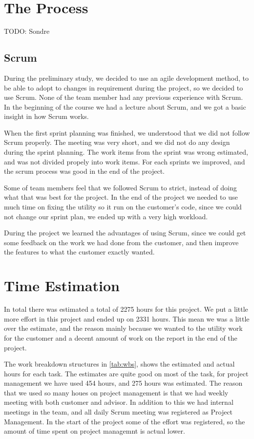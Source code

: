 \section{The Process}
TODO: Sondre

\subsection{Scrum}
During the preliminary study, we decided to use an agile development method, 
to be able to adopt to changes in requirement during the project, so we 
decided to use Scrum. None of the team member had any previous experience with 
Scrum. In the beginning of the course we had a lecture about Scrum, and we 
got a basic insight in how Scrum works.

When the first sprint planning was finished, we understood that we did not 
follow Scrum properly. The meeting was very short, and we did not do any 
design during the sprint planning. The work items from the sprint was wrong 
estimated, and was not divided propely into work items. For each sprints we 
improved, and the scrum process was good in the end of the project.

Some of team members feel that we followed Scrum to strict, instead of doing 
what that was best for the project. In the end of the project we needed to use 
much time on fixing the utility so it run on the customer's code, since we 
could not change our sprint plan, we ended up with a very high workload.

During the project we learned the advantages of using Scrum, since we could 
get some feedback on the work we had done from the customer, and then improve 
the features to what the customer exactly wanted. 

\section{Time Estimation}
In total there was estimated a total of 2275 hours for this project. We put a 
little more effort in this project and ended up on 2331 hours. This mean we 
was a little over the estimate, and the reason mainly because we wanted to the 
utility work for the customer and a decent amount of work on the report in the 
end of the project. 

The work breakdown structures in \autoref{tab:wbs}, shows the estimated and 
actual hours for each task. The estimates are quite good on most of the task, 
for project management we have used 454 hours, and 275 hours was estimated. 
The reason that we used so many houes on project management is that we had 
weekly meeting with both customer and advisor. In addition to this we had 
internal meetings in the team, and all daily Scrum meeting was registered as 
Project Management. In the start of the project some of the effort was 
registered, so the amount of time spent on project managemnt is actual lower.

